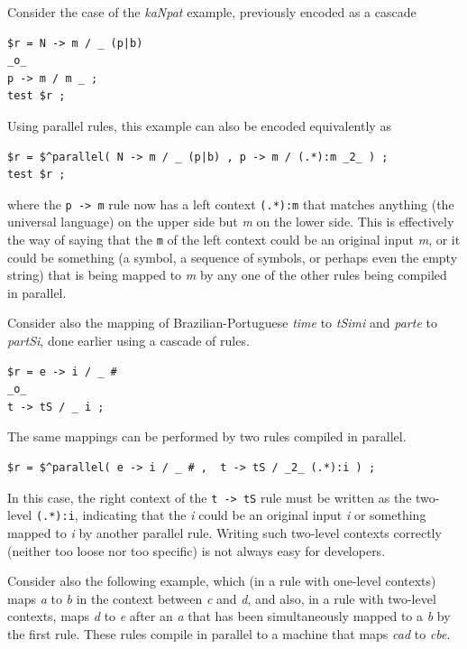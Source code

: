 Consider the case of the \emph{kaNpat} example, previously encoded as a cascade 

\begin{Verbatim}
$r = N -> m / _ (p|b)
_o_
p -> m / m _ ;
test $r ;
\end{Verbatim}

\noindent
Using parallel rules, this example can also be encoded equivalently as

\begin{Verbatim}
$r = $^parallel( N -> m / _ (p|b) , p -> m / (.*):m _2_ ) ;
test $r ;
\end{Verbatim}

\noindent
where the \texttt{p -> m} rule now has a left context \texttt{(.*):m} that matches
anything (the universal language) on the upper side but \emph{m} on the lower
side.  This is effectively the way of saying that the \texttt{m} of the left context could
be an original input \emph{m}, or it could be something (a symbol, a sequence of symbols,
or perhaps even the empty string) that is being mapped to \emph{m} by
any one of the other rules
being compiled in parallel.  

Consider also the mapping of Brazilian-Portuguese \emph{time} to \emph{tSimi} and \emph{parte} to \emph{partSi}, done earlier using a cascade of rules.  


\begin{Verbatim}
$r = e -> i / _ #
_o_
t -> tS / _ i ;
\end{Verbatim}

\noindent
The same mappings can be performed by two rules compiled in parallel.

\begin{Verbatim}
$r = $^parallel( e -> i / _ # ,  t -> tS / _2_ (.*):i ) ;
\end{Verbatim}

\noindent
In this case, the right context of the \texttt{t -> tS} rule must be written as the
two-level \texttt{(.*):i}, indicating that the \emph{i} could be an original input
\emph{i} or something mapped to \emph{i} by another parallel rule.  Writing such two-level
contexts correctly (neither too loose nor too specific) is not always easy for developers.  

Consider also the following example, which (in a rule with one-level contexts) maps
\emph{a} to \emph{b} in the context between \emph{c} and
\emph{d}, and also, in a rule with two-level contexts, maps \emph{d} to \emph{e} after an
\emph{a} that has been simultaneously mapped to a \emph{b} by the first rule.  These rules compile
in parallel to a machine that maps \emph{cad} to \emph{cbe}.

